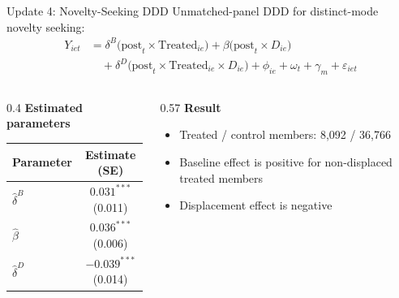 \documentclass[aspectratio=169]{beamer}  %
\begin{document}
\begin{frame}{Update 4: Novelty-Seeking DDD}
Unmatched-panel DDD for distinct-mode novelty seeking:
\begingroup
\small
\[
\begin{aligned}
Y_{iet} &= \delta^B \bigl(\text{post}_{t} \times \text{Treated}_{ie}\bigr)
+ \beta \bigl(\text{post}_{t} \times D_{ie}\bigr) \\
&\quad + \delta^D \bigl(\text{post}_{t} \times \text{Treated}_{ie} \times D_{ie}\bigr)
+ \phi_{ie} + \omega_t + \gamma_m + \varepsilon_{iet}
\end{aligned}
\]
\endgroup

\begin{columns}[T]
\begin{column}{0.4\linewidth}
\textbf{Estimated parameters}
\begin{table}[h]
\centering
\scriptsize
\begin{tabular}{lc}
\toprule
Parameter & Estimate (SE) \\
\midrule
$\hat{\delta}^B$ & $0.031^{***}$ (0.011) \\
$\hat{\beta}$ & $0.036^{***}$ (0.006) \\
$\hat{\delta}^D$ & $-0.039^{***}$ (0.014) \\
\bottomrule
\end{tabular}
\end{table}
\end{column}
\begin{column}{0.57\linewidth}
\textbf{Result}
\begin{itemize}
    \item Treated / control members: 8,092 / 36,766
    \item Baseline effect is positive for non-displaced treated members
    \item Displacement effect is negative
\end{itemize}
\end{column}
\end{columns}
\end{frame}
\end{document}
